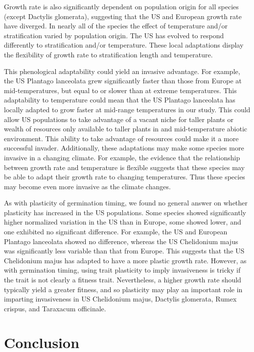 \documentclass[12pt]{article}\usepackage[]{graphicx}\usepackage[]{color}
\begin{document}
	
	Growth rate is also significantly dependent on population origin for all species (except Dactylis glomerata), suggesting that the US and European growth rate have diverged. In nearly all of the species the effect of temperature and/or stratification varied by population origin. The US has evolved to respond differently to stratification and/or temperature. These local adaptations display the flexibility of growth rate to stratification length and temperature. 
	
	This phenological adaptability could yield an invasive advantage. For example, the US Plantago lanceolata grew significantly faster than those from Europe at mid-temperatures, but equal to or slower than at extreme temperatures. This adaptability to temperature could mean that the US Plantago lanceolata has locally adapted to grow faster at mid-range temperatures in our study. This could allow US populations to take advantage of a vacant niche for taller plants or wealth of resources only available to taller plants in and mid-temperature abiotic environment. This ability to take advantage of resources could make it a more successful invader. Additionally, these adaptations may make some species more invasive in a changing climate. For example, the evidence that the relationship between growth rate and temperature is flexible suggests that these species may be able to adapt their growth rate to changing temperatures. Thus these species may become even more invasive as the climate changes.
	
	As with plasticity of germination timing, we found no general answer on whether plasticity has increased in the US populations. Some species showed significantly higher normalized variation in the US than in Europe, some showed lower, and one exhibited no significant difference. For example, the US and European Plantago lanceolata showed no difference, whereas the US Chelidonium majus was significantly less variable than that from Europe. This suggests that the US Chelidonium majus has adapted to have a more plastic growth rate. However, as with germination timing, using trait plasticity to imply invasiveness is tricky if the trait is not clearly a fitness trait.  Nevertheless, a higher growth rate should typically yield a greater fitness, and so plasticity may play an important role in imparting invasiveness in US Chelidonium majus, Dactylis glomerata, Rumex crispus, and Taraxacum officinale.  
	
	
	\section{Conclusion}
	
\end{document}
